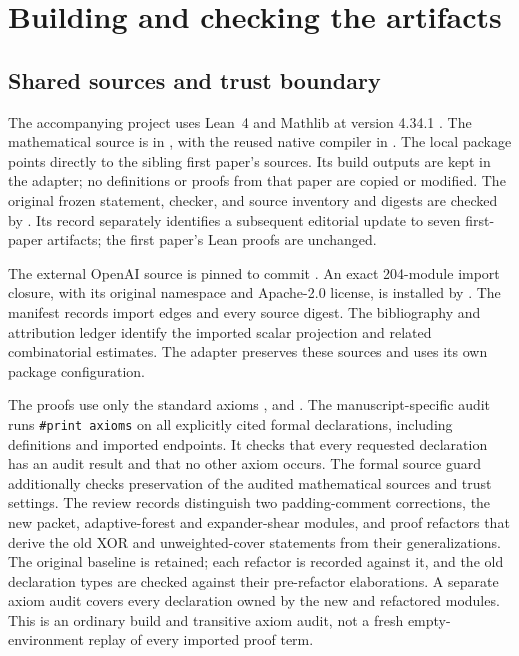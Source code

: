 \section{Building and checking the artifacts}\label{app:verification}

\subsection{Shared sources and trust boundary}

The accompanying project uses Lean~4 and Mathlib at version 4.34.1
\cite{Lean4,Mathlib2020,Mathlib4}. The mathematical source is in
, with the reused native compiler in
. The local package 
points directly to the sibling first paper's sources. Its build outputs are
kept in the adapter; no definitions or proofs from that paper are copied or
modified. The original frozen statement, checker, and source inventory and
digests are checked by . Its record
separately identifies a subsequent editorial update to seven first-paper
artifacts; the first paper's Lean proofs are unchanged.

The external OpenAI source is pinned to commit
. An exact 204-module import
closure, with its original namespace and Apache-2.0 license, is installed by
. The manifest
 records import edges and every
source digest. The bibliography and attribution ledger identify the imported scalar
projection and related combinatorial estimates. The adapter preserves these sources and uses its own
package configuration.

The proofs use only the standard axioms ,
 and . The manuscript-specific audit
runs \texttt{\#print axioms} on all explicitly cited formal declarations,
including definitions and imported endpoints. It checks that every requested
declaration has an audit result and that no other axiom occurs. The formal
source guard additionally checks preservation of the audited mathematical
sources and trust settings. The review records distinguish two padding-comment
corrections, the new packet, adaptive-forest and expander-shear modules, and proof refactors that derive the old
XOR and unweighted-cover statements from their generalizations. The original
baseline is retained; each refactor is recorded against it, and the old
declaration types are checked against their pre-refactor elaborations. A
separate axiom audit covers every declaration owned by the new and refactored
modules. This is an ordinary build and transitive axiom audit, not a fresh
empty-environment replay of every imported proof term.

